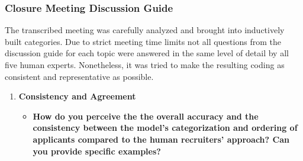 \documentclass[draft,final]{thesisclass} %
\begin{document}
\subsubsection{Closure Meeting Discussion Guide}
The transcribed meeting was carefully analyzed and brought into inductively built categories. Due to strict meeting time limits not all questions from the discussion guide for each topic were answered in the same level of detail by all five human experts. Nonetheless, it was tried to make the resulting coding as consistent and representative as possible.
\begin{enumerate}
    \item \textbf{Consistency and Agreement}
    \begin{itemize}
        \item \textbf{How do you perceive the the overall accuracy and the consistency between the model's categorization and ordering of applicants compared to the human recruiters' approach? Can you provide specific examples?}

\end{itemize}
\end{enumerate}
\end{document}

